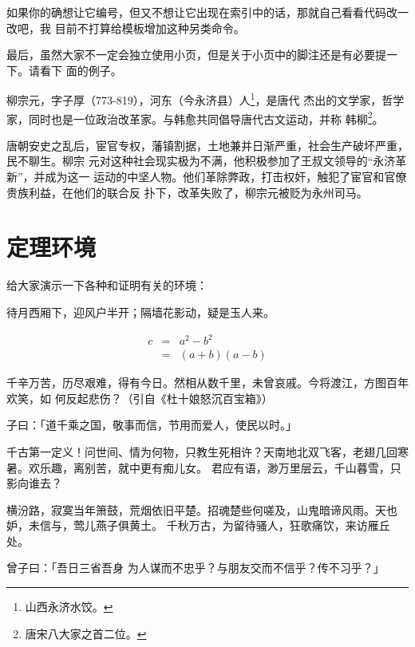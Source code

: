 \documentclass[../Main/thesis.tex]{subfiles}
\begin{document}
如果你的确想让它编号，但又不想让它出现在索引中的话，那就自己看看代码改一改吧，我
目前不打算给模板增加这种另类命令。

最后，虽然大家不一定会独立使用小页，但是关于小页中的脚注还是有必要提一下。请看下
面的例子。

\begin{minipage}[t]{\linewidth-2\parindent}
  柳宗元，字子厚（773-819），河东（今永济县）人\footnote{山西永济水饺。}，是唐代
  杰出的文学家，哲学家，同时也是一位政治改革家。与韩愈共同倡导唐代古文运动，并称
  韩柳\footnote{唐宋八大家之首二位。}。
\end{minipage}%

唐朝安史之乱后，宦官专权，藩镇割据，土地兼并日渐严重，社会生产破坏严重，民不聊生。柳宗
元对这种社会现实极为不满，他积极参加了王叔文领导的“永济革新”，并成为这一
运动的中坚人物。他们革除弊政，打击权奸，触犯了宦官和官僚贵族利益，在他们的联合反
扑下，改革失败了，柳宗元被贬为永州司马。

\section{定理环境}
\label{sec:theorem}

给大家演示一下各种和证明有关的环境：

\begin{assumption}
  待月西厢下，迎风户半开；隔墙花影动，疑是玉人来。
\end{assumption}
\begin{eqnarray}
  \label{eq:eqnxmp}
  c & = & a^2 - b^2 \\
  & = & (a+b)(a-b)
\end{eqnarray}

千辛万苦，历尽艰难，得有今日。然相从数千里，未曾哀戚。今将渡江，方图百年欢笑，如
何反起悲伤？（引自《杜十娘怒沉百宝箱》）

\begin{definition}
  子曰：「道千乘之国，敬事而信，节用而爱人，使民以时。」
\end{definition}

千古第一定义！问世间、情为何物，只教生死相许？天南地北双飞客，老翅几回寒暑。欢乐趣，离别苦，就中更有痴儿女。
君应有语，渺万里层云，千山暮雪，只影向谁去？

横汾路，寂寞当年箫鼓，荒烟依旧平楚。招魂楚些何嗟及，山鬼暗谛风雨。天也妒，未信与，莺儿燕子俱黄土。
千秋万古，为留待骚人，狂歌痛饮，来访雁丘处。

\begin{proposition}
  曾子曰：「吾日三省吾身 \pozhehao 为人谋而不忠乎？与朋友交而不信乎？传不习乎？」
\end{proposition}
\end{document}

